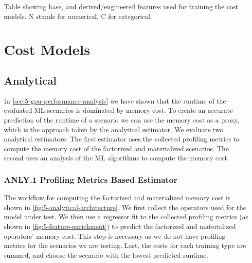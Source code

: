 \begin{table}[ht]
    \centering
    
    \caption[Feature table]{Table showing base, and derived/engineered features used for training the cost models. N stands for numerical, C for categorical.}
    \label{tab:5-features}
\end{table}


\section{Cost Models}
\label{sec:5-cost-models}



\subsection{Analytical}

In \autoref{sec:5-gpu-performance-analysis} we have shown that the runtime of the evaluated ML scenarios is dominated by memory cost. To create an accurate prediction of the runtime of a scenario we can use the memory cost as a proxy, which is the approach taken by the analytical estimator. We evaluate two analytical estimators. The first estimator uses the collected profiling metrics to compute the memory cost of the factorized and materialized scenarios. The second uses an analysis of the ML algorithms to compute the memory cost.

\subsubsection{ANLY.1 Profiling Metrics Based Estimator}

The workflow for computing the factorized and materialized memory cost is shown in \autoref{fig:5-analytical-architecture}. We first collect the operators used for the model under test. We then use a regressor fit to the collected profiling metrics (as shown in \autoref{fig:5-feature-enrichment}) to predict the factorized and materialized operators' memory cost. This step is necessary as we do not have profiling metrics for the scenarios we are testing. Last, the costs for each training type are summed, and choose the scenario with the lowest predicted runtime.


